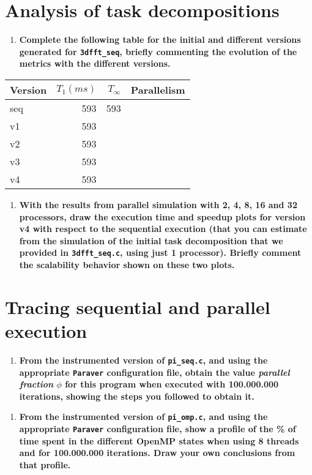 \documentclass[a4paper]{article}
\begin{document}
\section*{Analysis of task decompositions}

\begin{enumerate}[resume]
	\item \textbf{Complete the following table for the initial and different versions generated for \texttt{3dfft\_seq}, briefly commenting the evolution of the metrics with the different versions.}
\end{enumerate}

\begin{center}
	\begin{tabular}{l|rrr}
		Version & $T_1(ms)$ & $T_{\infty}$ & Parallelism \\
		\hline
		seq & 593 & 593 & \\
		v1 & 593 & & \\
		v2 & 593 & & \\
		v3 & 593 & & \\
		v4 & 593 & & 
	\end{tabular}
\end{center}

\begin{enumerate}[resume]
	\item \textbf{With the results from parallel simulation with 2, 4, 8, 16 and 32 processors, draw the execution time and speedup plots for version v4 with respect to the sequential execution (that you can estimate from the simulation of the initial task decomposition that we provided in \texttt{3dfft\_seq.c}, using just 1 processor). Briefly comment the scalability behavior shown on these two plots.}
\end{enumerate}

\section*{Tracing sequential and parallel execution}

\begin{enumerate}[resume]
	\item \textbf{From the instrumented version of \texttt{pi\_seq.c}, and using the appropriate \texttt{Paraver} configuration file, obtain the value \textit{parallel fraction} $\phi$ for this program when executed with 100.000.000 iterations, showing the steps you followed to obtain it.}
\end{enumerate}

\begin{enumerate}[resume]
	\item \textbf{From the instrumented version of \texttt{pi\_omp.c}, and using the appropriate \texttt{Paraver} configuration file, show a profile of the \% of time spent in the different OpenMP states when using 8 threads and for 100.000.000 iterations. Draw your own conclusions from that profile.}
\end{enumerate}
\end{document}
